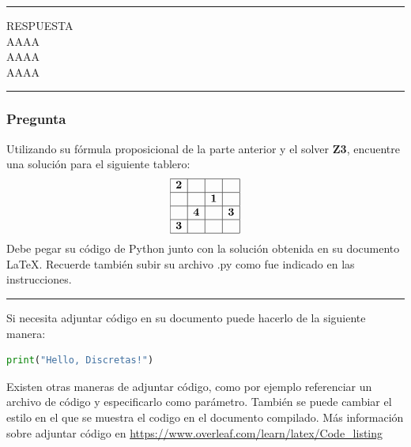 \documentclass[12pt]{article}
\begin{document}
\rule{\linewidth}{0.4pt} %

RESPUESTA\\AAAA\\AAAA\\AAAA

\rule{\linewidth}{0.4pt} %

\subsubsection*{Pregunta }

Utilizando su fórmula proposicional de la parte anterior y el solver \textbf{Z3}, encuentre una
solución para el siguiente tablero:
\[
\begin{array}{|c|c|c|c|} \hline
\textbf{2} & & &  \\ \hline
 & & \textbf{1} & \\ \hline
 & \textbf{4} & & \textbf{3} \\ \hline
\textbf{3} &  &  & \\ \hline
\end{array}
\]
Debe pegar su código de Python junto con la solución obtenida en su documento LaTeX. Recuerde también
subir su archivo .py como fue indicado en las instrucciones.

\rule{\linewidth}{0.4pt} %




Si necesita adjuntar código en su documento puede hacerlo de la siguiente manera:

\begin{lstlisting}[language=Python]
print("Hello, Discretas!")
\end{lstlisting}

Existen otras maneras de adjuntar código, como por ejemplo referenciar un archivo de código y especificarlo como parámetro. También se puede cambiar el estilo en el que se muestra el codigo en el documento compilado. Más información sobre adjuntar código en \href{https://www.overleaf.com/learn/latex/Code_listing}{https://www.overleaf.com/learn/latex/Code\_listing}







\end{document}
